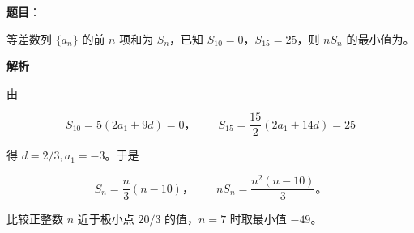 \begin{answer}

\textbf{题目}：

等差数列 $\{a_n\}$ 的前 $n$ 项和为 $S_n$，已知 $S_{10}=0$，$S_{15}=25$，则 $nS_n$ 的最小值为\gkblank{}。

\textbf{解析}

由

\nopagebreak[4]
\[S_{10}=5(2a_1+9d)=0\text{，}\qquad S_{15}=\frac{15}{2}(2a_1+14d)=25\]

得 $d=2/3,a_1=-3$。于是

\nopagebreak[4]
\[S_n=\frac n3(n-10)\text{，}\qquad nS_n=\frac{n^2(n-10)}3\text{。}\]

比较正整数 $n$ 近于极小点 $20/3$ 的值，$n=7$ 时取最小值 $-49$。


\end{answer}


